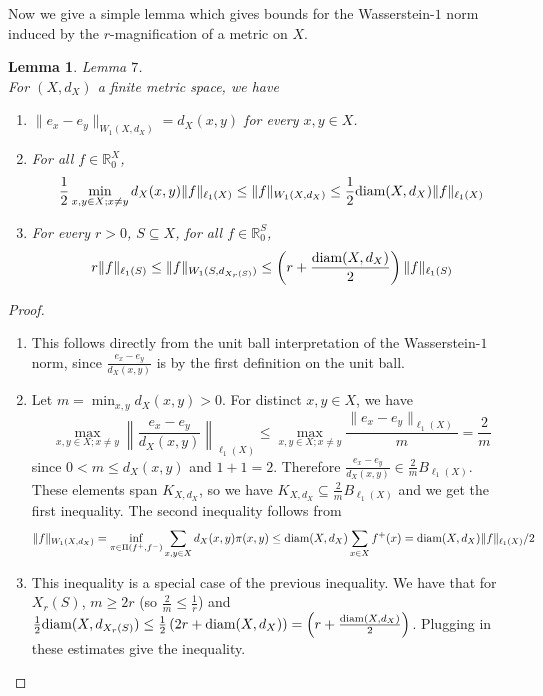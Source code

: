 \documentclass[10pt]{article}
\newtheorem{lemma}[theorem]{Lemma}
\theoremstyle{definition}
\theoremstyle{definition}
\theoremstyle{definition}
\theoremstyle{definition}
\newcommand{\R}
{\mathbb{R}}
\newcommand{\txt}[1]
{\textnormal{#1}}
\begin{document}
Now we give a simple lemma which gives bounds for the Wasserstein-$1$ norm induced by the $r$-magnification of a metric on $X$.
\begin{lemma} Lemma $7$. \\
For $(X, d_X)$ a finite metric space, we have
\begin{enumerate}

\item $\|e_x - e_y\|_{W_1(X, d_X)} = d_X(x, y)$ for every $x, y \in X$. 

\item For all $f \in \R_0^X$, 
\[
\frac{1}{2}\min_{x, y \in X; x \neq y} d_X(x, y)\|f\|_{\ell_1(X)} \leq \|f\|_{W_1(X, d_X)} \leq \frac{1}{2}\txt{diam}(X, d_X)\|f\|_{\ell_1(X)}
\]

\item For every $r > 0$, $S \subseteq X$, for all $f \in \R_0^S$,
\[
r\|f\|_{\ell_1(S)} \leq \|f\|_{W_1(S, d_{X_r(S)})} \leq \left(r + \frac{\txt{diam}(X, d_X)}{2}\right)\|f\|_{\ell_1(S)}
\]
\end{enumerate}
\end{lemma}
\begin{proof}

\begin{enumerate}

\item This follows directly from the unit ball interpretation of the Wasserstein-$1$ norm, since $\frac{e_x - e_y}{d_X(x, y)}$ is by the first definition on the unit ball.

\item Let $m = \min_{x, y} d_X(x, y) > 0$. For distinct $x, y \in X$, we have
\[
\max_{x, y \in X; x \neq y}\left\|\frac{e_x - e_y}{d_X(x, y)} \right\|_{\ell_1(X)} \leq \max_{x, y \in X; x \neq y} \frac{\|e_x - e_y\|_{\ell_1(X)}}{m} = \frac{2}{m}
\]
since $0 < m \leq d_X(x, y)$ and $1 + 1 = 2$. Therefore $\frac{e_x - e_y}{d_X(x, y)} \in \frac{2}{m}B_{\ell_1(X)}$. These elements span $K_{X, d_X}$, so we have $K_{X, d_X} \subseteq \frac{2}{m}B_{\ell_1(X)}$ and we get the first inequality. 
The second inequality follows from 
\[
\|f\|_{W_1(X, d_X)} = \inf_{\pi \in \Pi(f^+, f^-)} \sum_{x, y \in X} d_X(x, y) \pi(x, y) \leq \txt{diam}(X, d_X)\sum_{x \in X} f^{+}(x) = \txt{diam}(X, d_X)\|f\|_{\ell_1(X)}/2
\]

\item This inequality is a special case of the previous inequality. We have that for $X_r(S)$, $m \geq 2r$ (so $\frac{2}{m} \leq \frac{1}{r}$) and $\frac{1}{2}\txt{diam}(X, d_{X_r(S)}) \leq \frac{1}{2}\left(2r  + \txt{diam}(X, d_X)\right) = \left(r + \frac{\txt{diam}(X, d_X)}{2}\right)$. Plugging in these estimates give the inequality.

\end{enumerate}
\end{proof}
\end{document}
